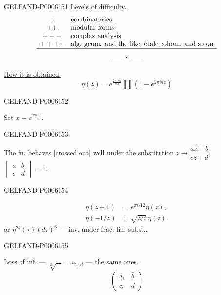 \begin{GelfandAdjacentEvidence}{GELFAND-P000615}{1}
\underline{Levels of difficulty.}
\[
\begin{array}{cl}
+&\text{combinatorics}\\
++&\text{modular forms}\\
+++&\text{complex analysis}\\
++++&\text{alg. geom. and the like, étale cohom. and so on}\\\hline
\end{array}
\]
\[\rule{1.8em}{.4pt}\;\boldsymbol{\cdot}\;\rule{1.8em}{.4pt}\]

\underline{How it is obtained.}
\[
\eta(z)=e^{\frac{2\pi inz}{24}}\prod(1-e^{2\pi inz})
\]
\end{GelfandAdjacentEvidence}
\begin{GelfandAdjacentEvidence}{GELFAND-P000615}{2}

Set \(x=e^{\frac{2\pi inz}{24}}\).
\end{GelfandAdjacentEvidence}
\begin{GelfandAdjacentEvidence}{GELFAND-P000615}{3}

The fn. behaves [crossed out] well under the substitution
\(z\to\dfrac{az+b}{cz+d}\),
\(\begin{vmatrix}a&b\\c&d\end{vmatrix}=1\).
\end{GelfandAdjacentEvidence}
\begin{GelfandAdjacentEvidence}{GELFAND-P000615}{4}

\[
\begin{aligned}
\eta(z+1)&=e^{\pi i/12}\eta(z),\\
\eta(-1/z)&=\sqrt{z/i}\,\eta(z).
\end{aligned}
\]
or \(\eta^{24}(\tau)(d\tau)^6\) — inv. under frac.-lin. subst..
\end{GelfandAdjacentEvidence}
\begin{GelfandAdjacentEvidence}{GELFAND-P000615}{5}


Loss of inf. — \(\sqrt[24]{\ldots}=\omega_{c,d}\) — the same ones.
\[
\begin{pmatrix}a,&\bar b\\c,&d\end{pmatrix}
\]
\end{GelfandAdjacentEvidence}
